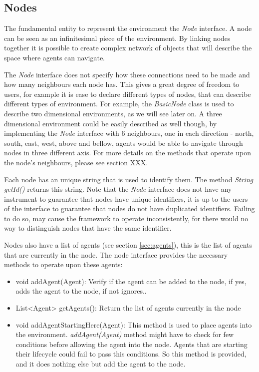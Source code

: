 \subsection{Nodes}

The fundamental entity to represent the environment the \emph{Node} interface. A node can be seen as an infinitesimal piece of the environment. By linking nodes together it is possible to create complex network of objects that will describe the space where agents can navigate.

The \emph{Node} interface does not specify how these connections need to be made and how many neighbours each node has. This gives a great degree of freedom to users, for example it is ease to declare different types of nodes, that can describe different types of environment. For example, the \emph{BasicNode} class is used to describe two dimensional environments, as we will see later on. A three dimensional environment could be easily described as well though, by implementing the \emph{Node} interface with 6 neighbours, one in each direction - north, south, east, west, above and bellow, agents would be able to navigate through nodes in three different axis. For more details on the methods that operate upon the node's neighbours, please see section XXX.

Each node has an unique string that is used to identify them. The method \emph{String getId()} returns this string. Note that the \emph{Node} interface does not have any instrument to guarantee that nodes have unique identifiers, it is up to the users of the interface to guarantee that nodes do not have duplicated identifiers. Failing to do so, may cause the framework to operate inconsistently, for there would no way to distinguish nodes that have the same identifier. 

Nodes also have a list of agents (see section \ref{sec:agents}), this is the list of agents that are currently in the node. The node interface provides the necessary methods to operate upon these agents:

\begin{itemize}
  \item void addAgent(Agent): Verify if the agent can be added to the node, if yes, adds the agent to the node, if not ignores..
  \item List<Agent> getAgents(): Return the list of agents currently in the node
  \item void addAgentStartingHere(Agent): This method is used to place agents into the environment. \emph{addAgent(Agent)} method might have to check for few conditions before allowing the agent into the node. Agents that are starting their lifecycle could fail to pass this conditions. So this method is provided, and it does nothing else but add the agent to the node.
\end{itemize}

